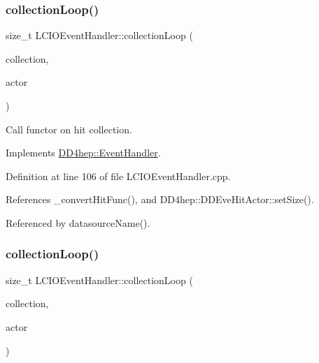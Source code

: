 \subsubsection{\texorpdfstring{collection\+Loop()}{collectionLoop()}\hspace{0.1cm}{\footnotesize\ttfamily [1/2]}}
{\footnotesize\ttfamily size\+\_\+t L\+C\+I\+O\+Event\+Handler\+::collection\+Loop (\begin{DoxyParamCaption}\item[{const std\+::string \&}]{collection,  }\item[{\hyperlink{struct_d_d4hep_1_1_d_d_eve_hit_actor}{D\+D\+Eve\+Hit\+Actor} \&}]{actor }\end{DoxyParamCaption})\hspace{0.3cm}{\ttfamily [virtual]}}



Call functor on hit collection. 



Implements \hyperlink{class_d_d4hep_1_1_event_handler_a454baeb81b675f3ebd8bb4293064b787}{D\+D4hep\+::\+Event\+Handler}.



Definition at line 106 of file L\+C\+I\+O\+Event\+Handler.\+cpp.



References \+\_\+convert\+Hit\+Func(), and D\+D4hep\+::\+D\+D\+Eve\+Hit\+Actor\+::set\+Size().



Referenced by datasource\+Name().

\hypertarget{class_d_d4hep_1_1_l_c_i_o_event_handler_aa741ce2b60b3eddd4ddeb1fba6197a86}{}\label{class_d_d4hep_1_1_l_c_i_o_event_handler_aa741ce2b60b3eddd4ddeb1fba6197a86} 
\subsubsection{\texorpdfstring{collection\+Loop()}{collectionLoop()}\hspace{0.1cm}{\footnotesize\ttfamily [2/2]}}
{\footnotesize\ttfamily size\+\_\+t L\+C\+I\+O\+Event\+Handler\+::collection\+Loop (\begin{DoxyParamCaption}\item[{const std\+::string \&}]{collection,  }\item[{\hyperlink{struct_d_d4hep_1_1_d_d_eve_particle_actor}{D\+D\+Eve\+Particle\+Actor} \&}]{actor }\end{DoxyParamCaption})\hspace{0.3cm}{\ttfamily [virtual]}}



